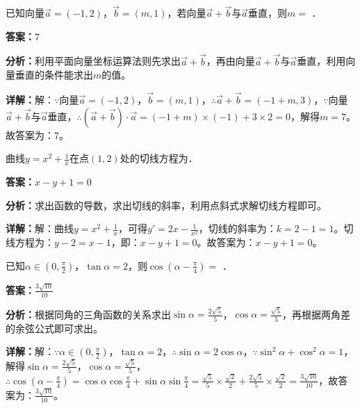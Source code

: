 \begin{question}[points=5]
已知向量$\vec{a}=(-1,2)$，$\vec{b}=(m,1)$，若向量$\vec{a}+\vec{b}$与$\vec{a}$垂直，则$m=$ ．
\fillin[{$7$}]
\begin{solution}
\textbf{答案：}$7$

\textbf{分析：}利用平面向量坐标运算法则先求出$\vec{a}+\vec{b}$，再由向量$\vec{a}+\vec{b}$与$\vec{a}$垂直，利用向量垂直的条件能求出$m$的值。

\textbf{详解：}解：$\because$向量$\vec{a}=(-1,2)$，$\vec{b}=(m,1)$，$\therefore\vec{a}+\vec{b}=(-1+m,3)$，$\because$向量$\vec{a}+\vec{b}$与$\vec{a}$垂直，$\therefore(\vec{a}+\vec{b})\cdot\vec{a}=(-1+m)\times(-1)+3\times2=0$，解得$m=7$。故答案为：7。
\end{solution}
\end{question}

\begin{question}[points=5]
曲线$y=x^2+\frac{1}{x}$在点$(1,2)$处的切线方程为．
\fillin[{$x-y+1=0$}]
\begin{solution}
\textbf{答案：}$x-y+1=0$

\textbf{分析：}求出函数的导数，求出切线的斜率，利用点斜式求解切线方程即可。

\textbf{详解：}解：曲线$y=x^2+\frac{1}{x}$，可得$y'=2x-\frac{1}{x^2}$，切线的斜率为：$k=2-1=1$。切线方程为：$y-2=x-1$，即：$x-y+1=0$。故答案为：$x-y+1=0$。
\end{solution}
\end{question}

\begin{question}[points=5]
已知$\alpha\in(0,\frac{\pi}{2})$，$\tan\alpha=2$，则$\cos(\alpha-\frac{\pi}{4})=$ ．
\begin{solution}
\textbf{答案：}$\frac{3\sqrt{10}}{10}$

\textbf{分析：}根据同角的三角函数的关系求出$\sin\alpha=\frac{2\sqrt{5}}{5}$，$\cos\alpha=\frac{\sqrt{5}}{5}$，再根据两角差的余弦公式即可求出。

\textbf{详解：}解：$\because\alpha\in(0,\frac{\pi}{2})$，$\tan\alpha=2$，$\therefore\sin\alpha=2\cos\alpha$，$\because\sin^2\alpha+\cos^2\alpha=1$，解得$\sin\alpha=\frac{2\sqrt{5}}{5}$，$\cos\alpha=\frac{\sqrt{5}}{5}$，$\therefore\cos(\alpha-\frac{\pi}{4})=\cos\alpha\cos\frac{\pi}{4}+\sin\alpha\sin\frac{\pi}{4}=\frac{\sqrt{5}}{5}\times\frac{\sqrt{2}}{2}+\frac{2\sqrt{5}}{5}\times\frac{\sqrt{2}}{2}=\frac{3\sqrt{10}}{10}$，故答案为：$\frac{3\sqrt{10}}{10}$。
\end{solution}
\end{question}

